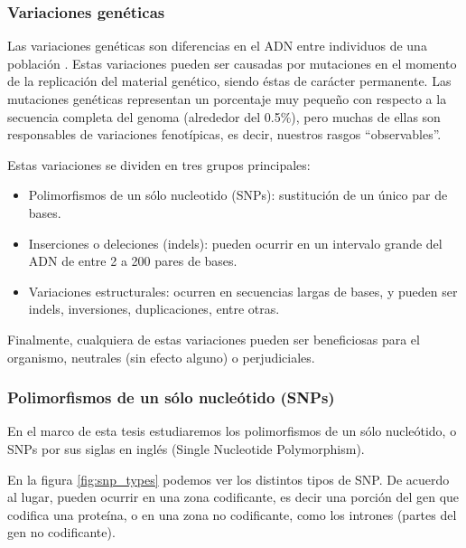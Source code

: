 \newpage


\subsubsection{Variaciones genéticas}

Las variaciones genéticas son diferencias en el ADN entre individuos de una población \cite{EMBL}. Estas variaciones pueden ser causadas por mutaciones en el momento de la replicación del material genético, siendo éstas de carácter permanente. Las mutaciones genéticas representan un porcentaje muy pequeño con respecto a la secuencia completa del genoma (alrededor del 0.5\%), pero muchas de ellas son responsables de variaciones fenotípicas, es decir, nuestros rasgos ``observables''. 

Estas variaciones se dividen en tres grupos principales:

\begin{itemize}
    \item Polimorfismos de un sólo nucleotido (SNPs): sustitución de un único par de bases. 
    \item Inserciones o deleciones (indels): pueden ocurrir en un intervalo grande del ADN de entre 2 a 200 pares de bases.
    \item Variaciones estructurales: ocurren en secuencias largas de bases, y pueden ser indels, inversiones, duplicaciones, entre otras.
    
\end{itemize}

Finalmente, cualquiera de estas variaciones pueden ser beneficiosas para el organismo, neutrales (sin efecto alguno) o perjudiciales. 

\subsubsection{Polimorfismos de un sólo nucleótido (SNPs)}

En el marco de esta tesis estudiaremos los polimorfismos de un sólo nucleótido, o SNPs por sus siglas en inglés (Single Nucleotide Polymorphism). 

En la figura \ref{fig:snp_types} podemos ver los distintos tipos de SNP. De acuerdo al lugar, pueden ocurrir en una zona codificante, es decir una porción del gen que codifica una proteína, o en una zona no codificante, como los intrones (partes del gen no codificante).

